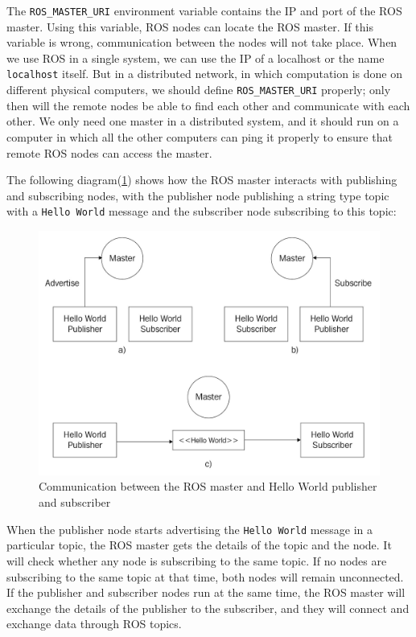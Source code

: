 \documentclass[../../main]{subfiles}
\begin{document}
The \texttt{ROS\_MASTER\_URI} environment variable contains the IP and port of the ROS master. Using this variable, ROS nodes can locate the ROS master. If this variable is wrong, communication between the nodes will not take place. When we use ROS in a single system, we can use the IP of a localhost or the name \texttt{localhost} itself. But in a distributed network, in which computation is done on different physical computers, we should define \texttt{ROS\_MASTER\_URI} properly; only then will the remote nodes be able to find each other and communicate with each other. We only need one master in a distributed system, and it should run on a computer in which all the other computers can ping it properly to ensure that remote ROS nodes can access the master.


The following diagram(\cref{fig:helloWorld}) shows how the ROS master interacts with publishing and
subscribing nodes, with the publisher node publishing a string type topic with a \texttt{Hello
World} message and the subscriber node subscribing to this topic:
\begin{figure}[ht]
    \centering
    \includegraphics{img/helloWorld.jpg}
    \caption{Communication between the ROS master and Hello World publisher and subscriber}
    \label{fig:helloWorld}
\end{figure}
When the publisher node starts advertising the \texttt{Hello World} message in a particular
topic, the ROS master gets the details of the topic and the node. It will check whether any
node is subscribing to the same topic. If no nodes are subscribing to the same topic at that
time, both nodes will remain unconnected. If the publisher and subscriber nodes run at
the same time, the ROS master will exchange the details of the publisher to the subscriber,
and they will connect and exchange data through ROS topics.
\end{document}

